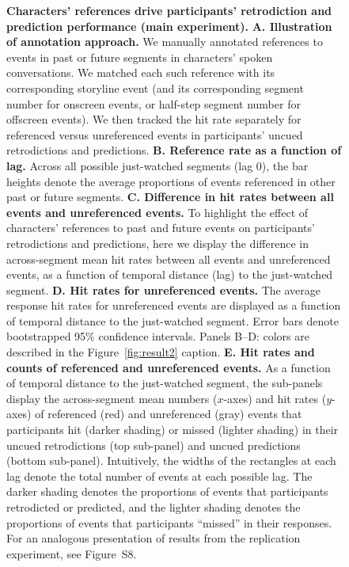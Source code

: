 \documentclass[10pt]{article}
\newcommand{\refEffectRep}{S8}
\begin{document}
\begin{figure}[tp]
  \caption{\textbf{Characters' references drive participants' retrodiction and prediction performance (main experiment).} \textbf{A. Illustration of annotation approach.} We manually annotated references to events in past or future segments in characters' spoken conversations. We matched each such reference with its corresponding storyline event (and its corresponding segment number for onscreen events, or half-step segment number for offscreen events). We then tracked the hit rate separately for referenced versus unreferenced events in participants' uncued retrodictions and predictions. \textbf{B. Reference rate as a function of lag.} Across all possible just-watched segments (lag 0), the bar heights denote the average proportions of events referenced in other past or future segments. \textbf{C. Difference in hit rates between all events and unreferenced events.} To highlight the effect of characters' references to past and future events on participants' retrodictions and predictions, here we display the difference in across-segment mean hit rates between all events and unreferenced events, as a function of temporal distance (lag) to the just-watched segment. \textbf{D. Hit rates for unreferenced events.} The average response hit rates for unreferenced events are displayed as a function of temporal distance to the just-watched segment. Error bars denote bootstrapped 95\% confidence intervals. Panels B--D: colors are described in the Figure~\ref{fig:result2} caption. \textbf{E. Hit rates and counts of referenced and unreferenced events.} As a function of temporal distance to the just-watched segment, the sub-panels display the across-segment mean numbers ($x$-axes) and hit rates ($y$-axes) of referenced (red) and unreferenced (gray) events that participants hit (darker shading) or missed (lighter shading) in their uncued retrodictions (top sub-panel) and uncued predictions (bottom sub-panel). Intuitively, the widths of the rectangles at each lag denote the total number of events at each possible lag. The darker shading denotes the proportions of events that participants retrodicted or predicted, and the lighter shading denotes the proportions of events that participants ``missed'' in their responses. For an analogous presentation of results from the replication experiment, see Figure~\refEffectRep.}

  \label{fig:result3}
\end{figure}
\end{document}
